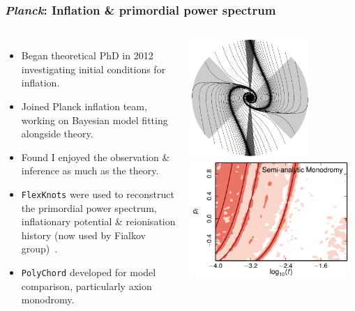 \documentclass[aspectratio=169]{beamer}
\begin{document}
\begin{frame}
    \frametitle{\textit{Planck}: Inflation \& primordial power spectrum}
    \begin{columns}
        \begin{itemize}
            \item Began theoretical PhD in 2012 investigating initial conditions for inflation.
            \item Joined Planck inflation team, working on Bayesian model fitting alongside theory.
            \item Found I enjoyed the observation \& inference as much as the theory.
            \item \texttt{FlexKnots} were used to reconstruct the primordial power spectrum, inflationary potential \& reionisation history (now used by Fialkov group)~.
            \item \texttt{PolyChord} developed for model comparison, particularly axion monodromy.
        \end{itemize}

        \includegraphics[height=0.4\textwidth]{figures/kinetic_dominance.pdf}%
        \includegraphics[height=0.4\textwidth]{figures/axion_monodromy.pdf}



\end{columns}
\end{frame}
\end{document}
